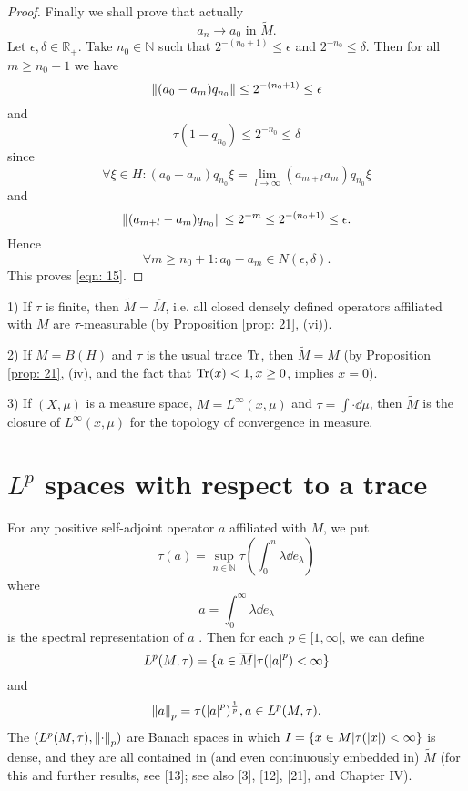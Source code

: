 \begin{proof}
    Finally we shall prove that actually
    \begin{equation}
        a_n\to a_0 \text{ in }\widetilde{M}.
    \end{equation}\label{eqn: 15}
    Let $\epsilon,\delta\in \mathbb{R}_+$. Take $n_0\in \mathbb{N}$ such that $2^{-(n_0+1)}\leq \epsilon$ and $2^{-n_0}\leq \delta$. Then for all $m\geq n_0+1$ we have
    \[
        \norm{(a_0-a_m)q_{n_0}}\leq 2^{-(n_0+1)}\leq \epsilon
    \]
    and
    \[
        \tau(1-q_{n_0})\leq 2^{-n_0}\leq \delta
    \]
    since
    \[
        \forall \xi\in H:(a_0-a_m)q_{n_0}\xi=\lim_{l\to\infty}(a_{m+l}a_m)q_{n_0}\xi
    \]
    and
    \[
        \norm{(a_{m+l}-a_m)q_{n_0}}\leq 2^{-m}\leq 2^{-(n_0+1)}\leq \epsilon.
    \]
    Hence
    \[
        \forall m\geq n_0+1:a_0-a_m\in N(\epsilon,\delta).
    \]
    This proves \eqref{eqn: 15}.
\end{proof}
\begin{example}
    1) If $\tau$ is finite, then $\widetilde{M}=\overline{M}$, i.e. all closed densely defined operators affiliated with $M$ are $\tau$-measurable (by Proposition \ref{prop: 21}, (vi)).\par
    2) If $M=B(H)$ and $\tau$ is the usual trace $\Tr$, then $\widetilde{M}=M$ (by Proposition \ref{prop: 21}, (iv), and the fact that $\Tr(x) < 1, x\geq 0$, implies $x = 0$).\par
    3) If $(X,\mu)$ is a measure space, $M = L^\infty(x,\mu)$ and $\tau=\int\cdot \dd \mu$, then $\widetilde{M}$ is the closure of $L^\infty(x,\mu)$ for the topology of convergence in measure.
\end{example}
\section{$L^p$ spaces with respect to a trace}
For any positive self-adjoint operator $a$ affiliated with $M$, we put
\[
    \tau(a)=\sup_{n\in \mathbb{N}}\tau\left( \int_0^n \lambda\dd e_\lambda \right)
\]
where
\[
    a=\int_0^\infty \lambda  \dd e_\lambda
\]
is the spectral representation of $a$ . Then for each $p\in [1,\infty[$, we can define
\[
    L^p(M,\tau)=\{a\in \overline{M}|\tau(\abs{a}^p)<\infty\}
\]
and
\[
    \norm{a}_p=\tau(\abs{a}^p)^\frac{1}{p},a\in L^p(M,\tau).
\]
The $(L^p(M,\tau),\norm{\cdot}_p)$ are Banach spaces in which $I=\{x\in M|\tau(\abs{x})<\infty\}$ is dense, and they are all contained in (and even continuously embedded in) $\widetilde{M}$ (for this and further results, see [13]; see also [3], [12], [21], and Chapter IV).

